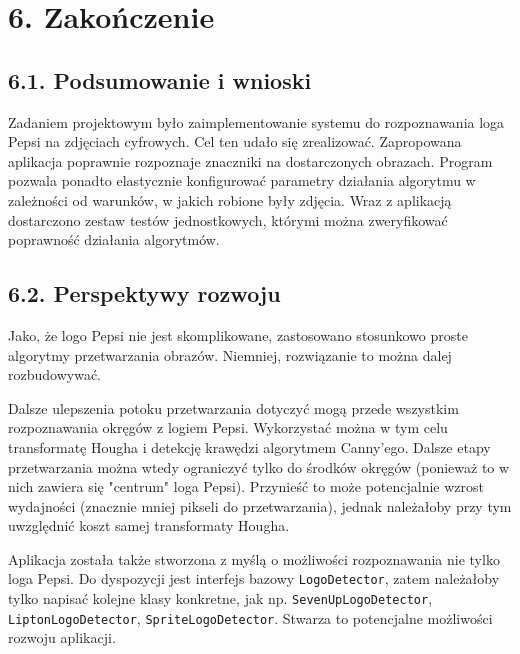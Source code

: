 \documentclass[11pt,a4paper,twoside]{report}
\begin{document}
\section*{6. Zakończenie}

	\subsection*{6.1. Podsumowanie i wnioski}

		Zadaniem projektowym było zaimplementowanie systemu do rozpoznawania loga Pepsi na zdjęciach cyfrowych. Cel ten udało się zrealizować. Zapropowana aplikacja poprawnie rozpoznaje znaczniki na dostarczonych obrazach. Program pozwala ponadto elastycznie konfigurować parametry działania algorytmu w zależności od warunków, w jakich robione były zdjęcia. Wraz z aplikacją dostarczono zestaw testów jednostkowych, którymi można zweryfikować poprawność działania algorytmów.

	\subsection*{6.2. Perspektywy rozwoju}

		Jako, że logo Pepsi nie jest skomplikowane, zastosowano stosunkowo proste algorytmy przetwarzania obrazów. Niemniej, rozwiązanie to można dalej rozbudowywać.

		Dalsze ulepszenia potoku przetwarzania dotyczyć mogą przede wszystkim rozpoznawania okręgów z logiem Pepsi. Wykorzystać można w tym celu transformatę Hougha i detekcję krawędzi algorytmem Canny'ego. Dalsze etapy przetwarzania można wtedy ograniczyć tylko do środków okręgów (ponieważ to w nich zawiera się "centrum" loga Pepsi). Przynieść to może potencjalnie wzrost wydajności (znacznie mniej pikseli do przetwarzania), jednak należałoby przy tym uwzględnić koszt samej transformaty Hougha.

		Aplikacja została także stworzona z myślą o możliwości rozpoznawania nie tylko loga Pepsi. Do dyspozycji jest interfejs bazowy \texttt{LogoDetector}, zatem należałoby tylko napisać kolejne klasy konkretne, jak np. \texttt{SevenUpLogoDetector}, \texttt{LiptonLogoDetector}, \texttt{SpriteLogoDetector}. Stwarza to potencjalne możliwości rozwoju aplikacji.
\end{document}
